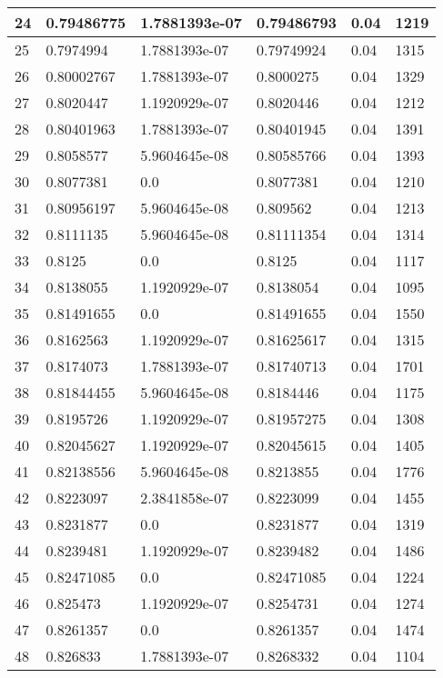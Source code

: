 \begin{longtable}{|l|l|l|l|l|l|}
24 & 0.79486775 & 1.7881393e-07 & 0.79486793 & 0.04 & 1219 \\ \hline 
25 & 0.7974994 & 1.7881393e-07 & 0.79749924 & 0.04 & 1315 \\ \hline 
26 & 0.80002767 & 1.7881393e-07 & 0.8000275 & 0.04 & 1329 \\ \hline 
27 & 0.8020447 & 1.1920929e-07 & 0.8020446 & 0.04 & 1212 \\ \hline 
28 & 0.80401963 & 1.7881393e-07 & 0.80401945 & 0.04 & 1391 \\ \hline 
29 & 0.8058577 & 5.9604645e-08 & 0.80585766 & 0.04 & 1393 \\ \hline 
30 & 0.8077381 & 0.0 & 0.8077381 & 0.04 & 1210 \\ \hline 
31 & 0.80956197 & 5.9604645e-08 & 0.809562 & 0.04 & 1213 \\ \hline 
32 & 0.8111135 & 5.9604645e-08 & 0.81111354 & 0.04 & 1314 \\ \hline 
33 & 0.8125 & 0.0 & 0.8125 & 0.04 & 1117 \\ \hline 
34 & 0.8138055 & 1.1920929e-07 & 0.8138054 & 0.04 & 1095 \\ \hline 
35 & 0.81491655 & 0.0 & 0.81491655 & 0.04 & 1550 \\ \hline 
36 & 0.8162563 & 1.1920929e-07 & 0.81625617 & 0.04 & 1315 \\ \hline 
37 & 0.8174073 & 1.7881393e-07 & 0.81740713 & 0.04 & 1701 \\ \hline 
38 & 0.81844455 & 5.9604645e-08 & 0.8184446 & 0.04 & 1175 \\ \hline 
39 & 0.8195726 & 1.1920929e-07 & 0.81957275 & 0.04 & 1308 \\ \hline 
40 & 0.82045627 & 1.1920929e-07 & 0.82045615 & 0.04 & 1405 \\ \hline 
41 & 0.82138556 & 5.9604645e-08 & 0.8213855 & 0.04 & 1776 \\ \hline 
42 & 0.8223097 & 2.3841858e-07 & 0.8223099 & 0.04 & 1455 \\ \hline 
43 & 0.8231877 & 0.0 & 0.8231877 & 0.04 & 1319 \\ \hline 
44 & 0.8239481 & 1.1920929e-07 & 0.8239482 & 0.04 & 1486 \\ \hline 
45 & 0.82471085 & 0.0 & 0.82471085 & 0.04 & 1224 \\ \hline 
46 & 0.825473 & 1.1920929e-07 & 0.8254731 & 0.04 & 1274 \\ \hline 
47 & 0.8261357 & 0.0 & 0.8261357 & 0.04 & 1474 \\ \hline 
48 & 0.826833 & 1.7881393e-07 & 0.8268332 & 0.04 & 1104 \\ \hline 

\end{longtable}
